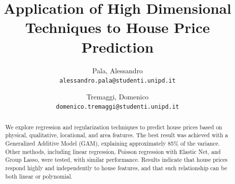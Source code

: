 \documentclass[a4paper, 11pt]{article}
\title{Application of High Dimensional Techniques to House Price Prediction}
\author{
  Pala, Alessandro\\
  \texttt{alessandro.pala@studenti.unipd.it}
  \and
  Tremaggi, Domenico\\
  \texttt{domenico.tremaggi@studenti.unipd.it}
}
\date{}
\begin{document}
\maketitle
\noindent
\begin{abstract}
We explore regression and regularization techniques to predict house prices based on physical, qualitative, locational, and area features. The best result was achieved with a Generalized Additive Model (GAM), explaining approximately 85\% of the variance. Other methods, including linear regression, Poisson regression with Elastic Net, and Group Lasso, were tested, with similar performance. Results indicate that house prices respond highly and independently to house features, and that such relationship can be both linear or polynomial.
\end{abstract}

\vspace{5pt}
\end{document}

